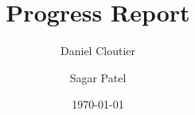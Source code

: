 \documentclass[12pt]{article}
\title{Progress Report}
\author{Daniel Cloutier \and Sagar Patel}
\date{\today}
\begin{document}
    \begin{singlespace}
        \maketitle 
    \end{singlespace}
    
\end{document}
